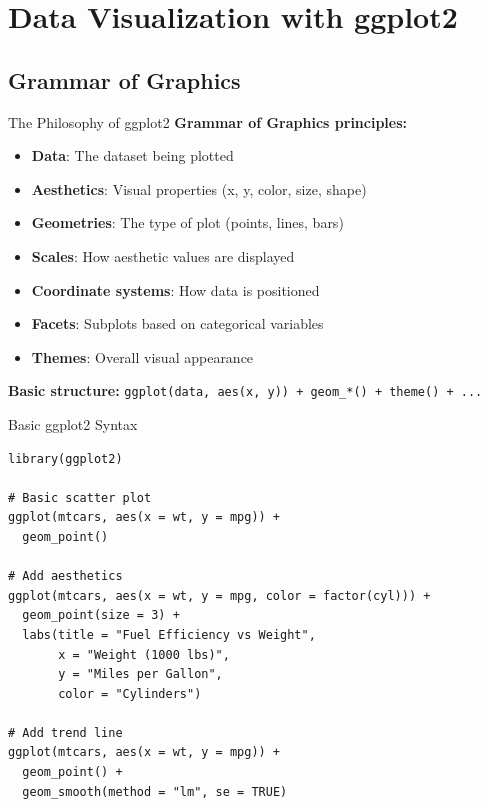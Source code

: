 \documentclass[aspectratio=169]{beamer}
\begin{document}
\section{Data Visualization with ggplot2}

\subsection{Grammar of Graphics}

\begin{frame}{The Philosophy of ggplot2}
  \textbf{Grammar of Graphics principles:}
  \begin{itemize}
    \item \textbf{Data}: The dataset being plotted
    \item \textbf{Aesthetics}: Visual properties (x, y, color, size, shape)
    \item \textbf{Geometries}: The type of plot (points, lines, bars)
    \item \textbf{Scales}: How aesthetic values are displayed
    \item \textbf{Coordinate systems}: How data is positioned
    \item \textbf{Facets}: Subplots based on categorical variables
    \item \textbf{Themes}: Overall visual appearance
  \end{itemize}

  \vspace{1em}
  \textbf{Basic structure:}
  \texttt{ggplot(data, aes(x, y)) + geom\_*() + theme() + ...}
\end{frame}

\begin{frame}[fragile]{Basic ggplot2 Syntax}
\begin{lstlisting}
library(ggplot2)

# Basic scatter plot
ggplot(mtcars, aes(x = wt, y = mpg)) +
  geom_point()

# Add aesthetics
ggplot(mtcars, aes(x = wt, y = mpg, color = factor(cyl))) +
  geom_point(size = 3) +
  labs(title = "Fuel Efficiency vs Weight",
       x = "Weight (1000 lbs)",
       y = "Miles per Gallon",
       color = "Cylinders")

# Add trend line
ggplot(mtcars, aes(x = wt, y = mpg)) +
  geom_point() +
  geom_smooth(method = "lm", se = TRUE)
\end{lstlisting}
\end{frame}
\end{document}

